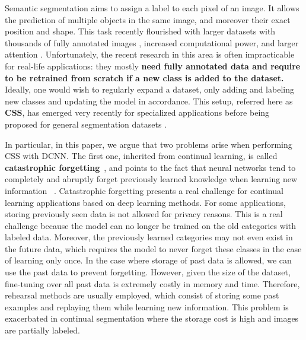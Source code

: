 Semantic segmentation aims to assign a label to each pixel of an image.
It allows the prediction of multiple objects in the same image, and moreover their exact position
and shape. This task recently flourished \citep{tao2020HRNet,zhang2020resnest,chen2018ZPSA} with
larger datasets with thousands of fully annotated images
\citep{zhou2017adedataset,neuhold2017mapillary}, increased computational power, and larger attention
\citep{wang2020axialdeeplab}. Unfortunately, the recent research in this area is often impracticable
for real-life applications: they mostly \textbf{need fully annotated data and require to be retrained from
    scratch if a new class is added to the dataset.} Ideally, one would wish to regularly expand a
dataset, only adding and labeling new classes and updating the model in accordance. This setup,
referred here as \textbf{\acf{CSS}}, has emerged very recently for specialized
applications
\citep{ozdemir2018learnthenewkeeptheold,ozdemir2019segmentationanotomical,tasar19incrementsegmentationremotesensing}
before being proposed for general segmentation datasets
\citep{michieli2019ilt,cermelli2020modelingthebackground}.


In particular, in this paper, we argue that two problems arise when performing \ac{CSS} with \acs{DCNN}. The
first one, inherited from continual learning, is called \textbf{catastrophic
    forgetting}~\citep{robins1995catastrophicforgetting,french1999catastrophicforgetting,thrun1998lifelonglearning},
and points to the fact that neural networks tend to completely and abruptly forget previously
learned knowledge when learning new information ~\citep{kemker2018measuringforgetting}. Catastrophic
forgetting presents a real challenge for continual learning applications based on deep learning
methods. For some applications, storing previously seen data is not allowed for privacy reasons.
This is a real challenge because the model can no longer be trained on the old categories with
labeled data. Moreover, the previously learned categories may not even exist in the future data,
which requires the model to never forget these classes in the case of learning only once. In the
case where storage of past data is allowed, we can use the past data to prevent forgetting. However,
given the size of the dataset, fine-tuning over all past data is extremely costly in memory and
time. Therefore, rehearsal methods are usually employed, which consist of storing some past
examples and replaying them while learning new information. This problem is exacerbated in continual
segmentation where the storage cost is high and images are partially labeled.

